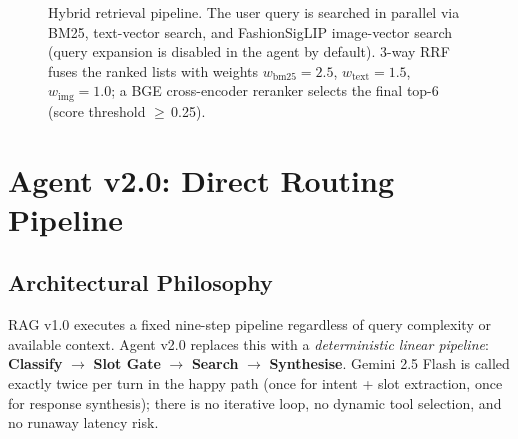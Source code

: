 \documentclass[12pt,a4paper]{article}
\begin{document}
\begin{figure}[H]
\caption{Hybrid retrieval pipeline. The user query is searched in
         parallel via BM25, text-vector search, and FashionSigLIP
         image-vector search (query expansion is disabled in the agent
         by default). 3-way RRF fuses the ranked lists with weights
         $w_{\text{bm25}}=2.5$, $w_{\text{text}}=1.5$, $w_{\text{img}}=1.0$;
         a BGE cross-encoder reranker selects the final top-6
         (score threshold $\geq$\,0.25).}
\label{fig:retrieval}
\end{figure}

\section{Agent v2.0: Direct Routing Pipeline}
\label{sec:agent}

\subsection{Architectural Philosophy}

RAG v1.0 executes a fixed nine-step pipeline regardless of query
complexity or available context.
Agent v2.0 replaces this with a \emph{deterministic linear pipeline}:
\textbf{Classify} $\to$ \textbf{Slot Gate} $\to$ \textbf{Search}
$\to$ \textbf{Synthesise}.
Gemini 2.5 Flash is called exactly twice per turn in the happy path
(once for intent + slot extraction, once for response synthesis);
there is no iterative loop, no dynamic tool selection, and no
runaway latency risk.
\end{document}

